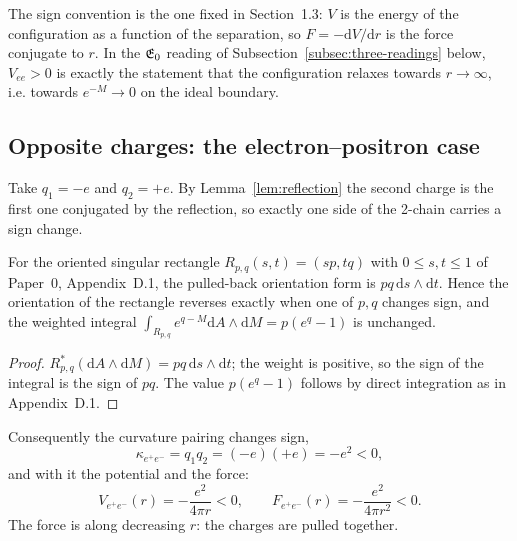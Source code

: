 \begin{remark}
\label{rem:relaxation}
The sign convention is the one fixed in Section~1.3: $V$ is the energy of the
configuration as a function of the separation, so $F=-\mathrm dV/\mathrm dr$ is
the force conjugate to $r$.  In the $\mathfrak{E}_0$ reading of
Subsection~\ref{subsec:three-readings} below, $V_{ee}>0$ is exactly the
statement that the configuration relaxes towards $r\to\infty$, i.e. towards
$e^{-M}\to0$ on the ideal boundary.
\end{remark}

\subsection{Opposite charges: the electron--positron case}

Take $q_1=-e$ and $q_2=+e$.  By Lemma~\ref{lem:reflection} the second charge is
the first one conjugated by the reflection, so exactly one side of the 2-chain
carries a sign change.

\begin{lemma}
\label{lem:orientation}
For the oriented singular rectangle $R_{p,q}(s,t)=(sp,tq)$ with
$0\le s,t\le1$ of Paper~0, Appendix~D.1, the pulled-back orientation form is
$pq\,\mathrm ds\wedge\mathrm dt$.  Hence the orientation of the rectangle
reverses exactly when one of $p,q$ changes sign, and the weighted integral
$\int_{R_{p,q}}e^{q-M}\mathrm dA\wedge\mathrm dM=p(e^{q}-1)$ is unchanged.
\end{lemma}

\begin{proof}
$R_{p,q}^*(\mathrm dA\wedge\mathrm dM)=pq\,\mathrm ds\wedge\mathrm dt$; the
weight is positive, so the sign of the integral is the sign of $pq$.  The value
$p(e^q-1)$ follows by direct integration as in Appendix~D.1.
\end{proof}

Consequently the curvature pairing changes sign,
\begin{equation}\label{eq:kappa-ep}
  \kappa_{e^+e^-}=q_1q_2=(-e)(+e)=-e^{2}<0,
\end{equation}
and with it the potential and the force:
\begin{equation}\label{eq:V-ep}
  V_{e^+e^-}(r)=-\frac{e^{2}}{4\pi r}<0,
  \qquad
  F_{e^+e^-}(r)=-\frac{e^{2}}{4\pi r^{2}}<0 .
\end{equation}
The force is along decreasing $r$: the charges are pulled together.

